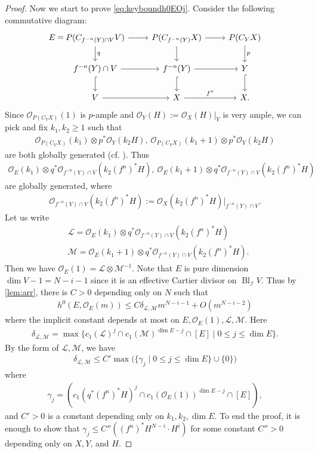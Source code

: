 \documentclass[12pt]{amsart}
\theoremstyle{plain}
\theoremstyle{definition}
\numberwithin{equation}{section}
\def\O{{ \mathcal{O}}}
\def\I{{ \mathcal{I}}}
\def\L{{ \mathcal{L}}}
\def\M{{ \mathcal{M}}}
\DeclareMathOperator{\Bl}{Bl}
\newcommand{\g}{\gamma}
\renewcommand{\d}{\delta}
\begin{document}
\begin{proof}
Now we start to prove \cref{eq:keyboundh0EOj}.
Consider the following commutative diagram:
\begin{equation}
\begin{tikzcd}
E \arrow[r,phantom,"="] &[-2em] P(C_{f^{-n}(Y)\cap V} V) \arrow[d,"q"] \arrow[r] & P(C_{f^{-n}(Y)}X) \arrow[d] \arrow[r] 
& P(C_{Y}X) \arrow[d,"p"] \\
& f^{-n}(Y)\cap V \arrow[d,hook] \arrow[r] &  f^{-n}(Y) \arrow[d,hook]  \arrow[r] & Y \arrow[d,hook] \\
& V \arrow[r] & X \arrow[r,"f^{n}"] & X .
\end{tikzcd}
\end{equation}
Since $\O_{P(C_{Y}X)}(1)$ is $p$-ample and $\O_{Y}(H):= \O_{X}(H)|_{Y}$ is very ample,
we can pick and fix $k_{1},k_{2} \geq 1$ such that
\begin{align}
\O_{P(C_{Y}X)}(k_{1}) \otimes p^{*}\O_{Y}(k_{2}H),\ \O_{P(C_{Y}X)}(k_{1}+1) \otimes p^{*}\O_{Y}(k_{2}H)
\end{align}
are both globally generated (cf. \cite[Part One, 1, 1.7]{Lazpos1}).
Thus 
\begin{align}
\O_{E}(k_{1}) \otimes q^{*}\O_{f^{-n}(Y) \cap V}(k_{2}(f^{n})^{*}H),\ \O_{E}(k_{1}+1) \otimes q^{*}\O_{f^{-n}(Y) \cap V}(k_{2}(f^{n})^{*}H)
\end{align}
are globally generated, where 
\begin{align}
\O_{f^{-n}(Y) \cap V}(k_{2}(f^{n})^{*}H) := \O_{X}(k_{2}(f^{n})^{*}H)|_{f^{-n}(Y) \cap V}.
\end{align}
Let us write
\begin{align}
&\L = \O_{E}(k_{1}) \otimes q^{*}\O_{f^{-n}(Y) \cap V}(k_{2}(f^{n})^{*}H)\\
&\M = \O_{E}(k_{1}+1) \otimes q^{*}\O_{f^{-n}(Y) \cap V}(k_{2}(f^{n})^{*}H).
\end{align}
Then we have $\O_{E}(1) = \L \otimes \M^{-1}$.
Note that $E$ is pure dimension $\dim V - 1 = N-i-1$ since it is an effective Cartier divisor on $\Bl_{\I}V$.
Thus by \cref{lem:arr}, there is $C > 0$ depending only on $N$ such that
\begin{align}
h^{0}(E, \O_{E}(m)) \leq C \d_{\L, \M} m^{N-i-1} + O(m^{N-i-2})
\end{align}
where the implicit constant depends at most on $E, \O_{E}(1), \L, \M$.
Here 
\begin{align}
\d_{\L,\M} = \max\{ c_{1}(\L)^{j}\cap c_{1}(\M)^{\dim E - j} \cap [E] \mid 0 \leq j \leq \dim E \}.
\end{align}
By the form of $\L, \M$, we have
\begin{align}
\d_{\L,\M} \leq C' \max\big( \{ \g_{j} \mid 0 \leq j \leq \dim E\} \cup \{0\}\big)
\end{align}
where
\begin{align}
\g_{j} = ( c_{1}(q^{*} (f^{n})^{*}H)^{j} \cap c_{1}(\O_{E}(1))^{\dim E - j} \cap [E]  ),
\end{align}
and $C' > 0$ is a constant depending only on $k_{1}, k_{2}, \dim E$.
To end the proof, it is enough to show that $\g_{j} \leq C'' ((f^{n})^{*}H^{N-i} \cdot H^{i})$
for some constant $C'' > 0$ depending only on $X, Y$, and $H$.



\end{proof}
\end{document}
